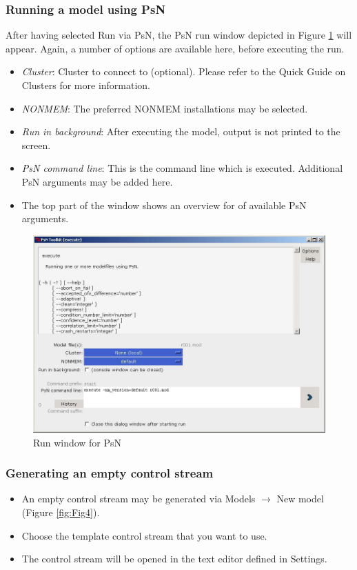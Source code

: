 
\subsubsection*{Running a model using PsN} 
After having selected Run via PsN, the PsN run window depicted in
Figure \ref{fig:Fig3} will appear. Again, a number of options are available here,
before executing the run.
\begin{itemize}
\item \emph{Cluster}: Cluster to connect to (optional). Please refer
  to the Quick Guide on Clusters for more information.
\item \emph{NONMEM}: The preferred NONMEM installations may be
  selected. 
\item \emph{Run in background}: After executing the model, output is
  not printed to the screen.
\item \emph{PsN command line}: This is the command line which is
  executed. Additional PsN arguments may be added here.
\item The top part of the window shows an overview for of available
  PsN arguments.
\end{itemize}

\begin{figure}[h] \centering
    \includegraphics[scale=.4]{images/working_5.jpg}
    \caption{Run window for PsN\label{fig:Fig3}}
\end{figure}


\subsubsection*{Generating an empty control stream}
\begin{itemize}
\item An empty control stream may be generated via  Models $ \rightarrow$  New model (Figure \ref{fig:Fig4}).
\item Choose the template control stream that you want to use.
\item The control stream will be opened in the text editor defined in Settings.
\end{itemize}

